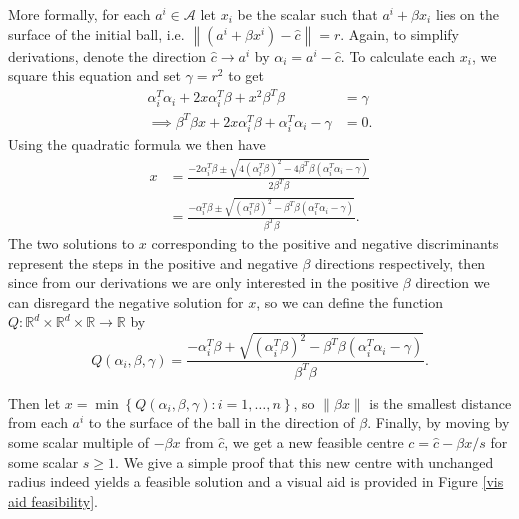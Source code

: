 \documentclass[11pt,twoside]{report}
\newcommand{\A}{\mathcal{A}} %
\newcommand{\norm}[1]{\left\lVert#1\right\rVert}
\theoremstyle{definition}
\numberwithin{theorem}{section}
\numberwithin{definition}{section}
\numberwithin{lemma}{section}
\numberwithin{proposition}{section}
\numberwithin{equation}{section}
\numberwithin{figure}{section}
\begin{document}
More formally, for each $a^i\in\A$ let $x_i$ be the scalar such that $a^i+\beta x_i$ lies on the surface of the initial ball, i.e. $\norm{(a^i+\beta x^i)-\hat{c}}=r$. Again, to simplify derivations, denote the direction $\hat{c}\to a^i$ by $\alpha_i=a^i-\hat{c}$. To calculate each $x_i$, we square this equation and set $\gamma=r^2$ to get
\begin{align*}
    \alpha_i^T\alpha_i + 2x\alpha_i^T\beta + x^2\beta^T\beta &= \gamma \\
    \implies \beta^T\beta x + 2x\alpha_i^T\beta + \alpha_i^T\alpha_i - \gamma &= 0.
\end{align*}
Using the quadratic formula we then have
\begin{align*}
    x &= \frac{-2\alpha_i^T\beta \pm \sqrt{4\left(\alpha_i^T\beta\right)^2 - 4\beta^T \beta\left(\alpha_i^T\alpha_i-\gamma\right)}}{2\beta^T\beta} \\[4pt]
    &= \frac{-\alpha_i^T\beta \pm \sqrt{\left(\alpha_i^T\beta\right)^2 - \beta^T \beta\left(\alpha_i^T\alpha_i-\gamma\right)}}{\beta^T\beta}.
\end{align*}
The two solutions to $x$ corresponding to the positive and negative discriminants represent the steps in the positive and negative $\beta$ directions respectively, then since from our derivations we are only interested in the positive $\beta$ direction we can disregard the negative solution for $x$, so we can define the function $Q:\mathbb{R}^d\times\mathbb{R}^d\times\mathbb{R}\to\mathbb{R}$ by
\begin{equation*}
    Q(\alpha_i,\beta,\gamma) = \frac{-\alpha_i^T\beta + \sqrt{\left(\alpha_i^T\beta\right)^2 - \beta^T \beta\left(\alpha_i^T\alpha_i-\gamma\right)}}{\beta^T\beta}.
\end{equation*}


Then let $x=\min\left\{Q(\alpha_i, \beta, \gamma):i=1,\ldots,n\right\}$, so $\norm{\beta x}$ is the smallest distance from each $a^i$ to the surface of the ball in the direction of $\beta$. Finally, by moving by some scalar multiple of $-\beta x$ from $\hat{c}$, we get a new feasible centre $c=\hat{c}-\beta x/s$ for some scalar $s\geq1$. We give a simple proof that this new centre with unchanged radius indeed yields a feasible solution and a visual aid is provided in Figure \ref{vis aid feasibility}.
\end{document}
